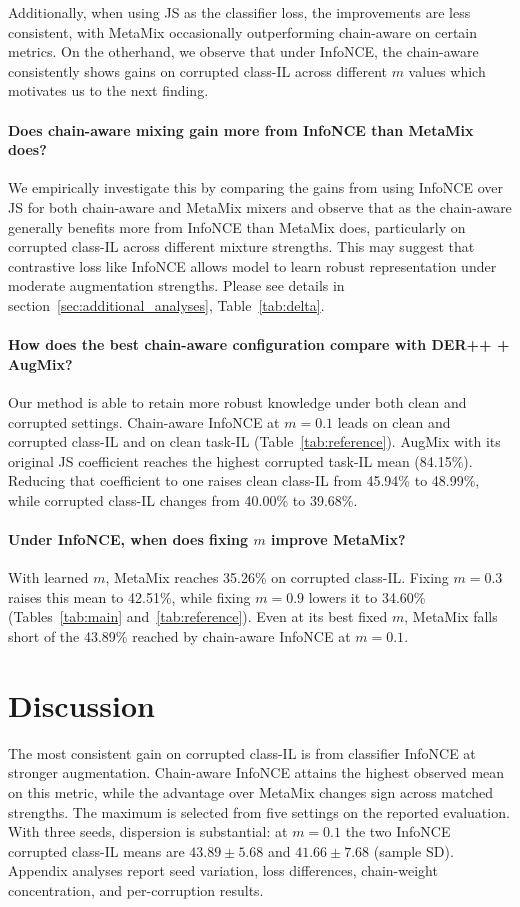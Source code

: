 \documentclass[10pt,twocolumn,letterpaper]{article}
\begin{document}
Additionally, when using JS as the classifier loss, the improvements are less consistent, with MetaMix occasionally outperforming chain-aware on certain metrics. On the otherhand, we observe that under InfoNCE, the chain-aware consistently shows gains on corrupted class-IL across different $m$ values which motivates us to the next finding.

\paragraph{Does chain-aware mixing gain more from InfoNCE than MetaMix does?} We empirically investigate this by comparing the gains from using InfoNCE over JS for both chain-aware and MetaMix mixers and observe that as the chain-aware generally benefits more from InfoNCE than MetaMix does, particularly on corrupted class-IL across different mixture strengths. This may suggest that contrastive loss like InfoNCE allows model to learn robust representation under moderate augmentation strengths. Please see details in section~\ref{sec:additional_analyses}, Table~\ref{tab:delta}.

\paragraph{How does the best chain-aware configuration compare with DER++ + AugMix?}
Our method is able to retain more robust knowledge under both clean and corrupted settings. Chain-aware InfoNCE at $m=0.1$ leads on clean and corrupted class-IL and on clean task-IL (Table~\ref{tab:reference}). AugMix with its original JS coefficient reaches the highest corrupted task-IL mean (84.15\%). Reducing that coefficient to one raises clean class-IL from 45.94\% to 48.99\%, while corrupted class-IL changes from 40.00\% to 39.68\%.

\paragraph{Under InfoNCE, when does fixing $m$ improve MetaMix?}
With learned $m$, MetaMix reaches 35.26\% on corrupted class-IL. Fixing $m=0.3$ raises this mean to 42.51\%, while fixing $m=0.9$ lowers it to 34.60\% (Tables~\ref{tab:main} and~\ref{tab:reference}). Even at its best fixed $m$, MetaMix falls short of the 43.89\% reached by chain-aware InfoNCE at $m=0.1$.



\section{Discussion}
The most consistent gain on corrupted class-IL is from classifier InfoNCE at stronger augmentation. Chain-aware InfoNCE attains the highest observed mean on this metric, while the advantage over MetaMix changes sign across matched strengths. The maximum is selected from five settings on the reported evaluation. With three seeds, dispersion is substantial: at $m=0.1$ the two InfoNCE corrupted class-IL means are $43.89\pm5.68$ and $41.66\pm7.68$ (sample SD). Appendix analyses report seed variation, loss differences, chain-weight concentration, and per-corruption results.
\end{document}
